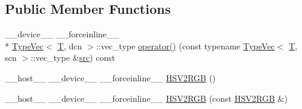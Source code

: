 \subsection*{Public Member Functions}
\begin{DoxyCompactItemize}
\item 
\-\_\-\-\_\-device\-\_\-\-\_\- \-\_\-\-\_\-forceinline\-\_\-\-\_\- \\*
\hyperlink{structcv_1_1gpu_1_1device_1_1TypeVec}{Type\-Vec}$<$ \hyperlink{calib3d_8hpp_a3efb9551a871ddd0463079a808916717}{T}, dcn $>$\-::vec\-\_\-type \hyperlink{structcv_1_1gpu_1_1device_1_1color__detail_1_1HSV2RGB_a32b393fc4ec2202daae65bad2d0d703f}{operator()} (const typename \hyperlink{structcv_1_1gpu_1_1device_1_1TypeVec}{Type\-Vec}$<$ \hyperlink{calib3d_8hpp_a3efb9551a871ddd0463079a808916717}{T}, scn $>$\-::vec\-\_\-type \&\hyperlink{legacy_8hpp_a371cd109b74033bc4366f584edd3dacc}{src}) const 
\item 
\-\_\-\-\_\-host\-\_\-\-\_\- \-\_\-\-\_\-device\-\_\-\-\_\- \-\_\-\-\_\-forceinline\-\_\-\-\_\- \hyperlink{structcv_1_1gpu_1_1device_1_1color__detail_1_1HSV2RGB_ac308d6c56e1b21b874ac1f351316bfae}{H\-S\-V2\-R\-G\-B} ()
\item 
\-\_\-\-\_\-host\-\_\-\-\_\- \-\_\-\-\_\-device\-\_\-\-\_\- \-\_\-\-\_\-forceinline\-\_\-\-\_\- \hyperlink{structcv_1_1gpu_1_1device_1_1color__detail_1_1HSV2RGB_a23de9a9cc5b6eddb4a7d0826b916179e}{H\-S\-V2\-R\-G\-B} (const \hyperlink{structcv_1_1gpu_1_1device_1_1color__detail_1_1HSV2RGB}{H\-S\-V2\-R\-G\-B} \&)
\end{DoxyCompactItemize}


